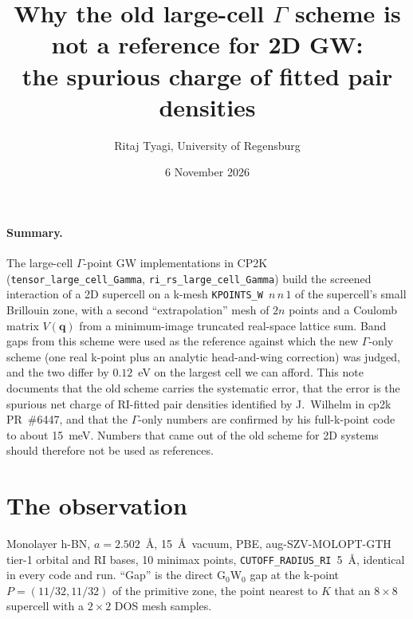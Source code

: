 \documentclass[11pt,a4paper]{article}
\title{Why the old large-cell $\Gamma$ scheme is not a reference for 2D GW:\\the spurious charge of fitted pair densities}
\author{Ritaj Tyagi, University of Regensburg}
\date{6 November 2026}
\newcommand{\bq}{\mathbf{q}}
\begin{document}
\maketitle

\paragraph{Summary.}
The large-cell $\Gamma$-point GW implementations in CP2K (\texttt{tensor\_large\_cell\_Gamma},
\texttt{ri\_rs\_large\_cell\_Gamma}) build the screened interaction of a 2D supercell on a
k-mesh \texttt{KPOINTS\_W}~$n\,n\,1$ of the supercell's small Brillouin zone, with a second
``extrapolation'' mesh of $2n$ points and a Coulomb matrix $V(\bq)$ from a minimum-image
truncated real-space lattice sum. Band gaps from this scheme were used as the reference against
which the new $\Gamma$-only scheme (one real k-point plus an analytic head-and-wing correction)
was judged, and the two differ by $0.12$~eV on the largest cell we can afford. This note
documents that the old scheme carries the systematic error, that the error is the spurious net
charge of RI-fitted pair densities identified by J.~Wilhelm in cp2k PR~\#6447, and that the
$\Gamma$-only numbers are confirmed by his full-k-point code to about 15~meV. Numbers that came
out of the old scheme for 2D systems should therefore not be used as references.

\section{The observation}

Monolayer h-BN, $a = 2.502$~\AA, 15~\AA\ vacuum, PBE, aug-SZV-MOLOPT-GTH tier-1 orbital and RI
bases, 10 minimax points, \texttt{CUTOFF\_RADIUS\_RI}~5~\AA, identical in every code and run.
``Gap'' is the direct G$_0$W$_0$ gap at the k-point $P = (11/32, 11/32)$ of the primitive zone,
the point nearest to $K$ that an $8\times8$ supercell with a $2\times2$ DOS mesh samples.
\end{document}
